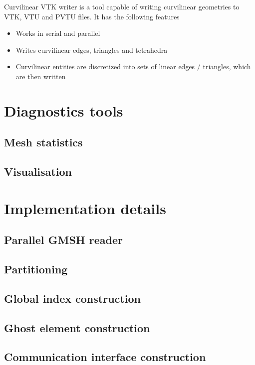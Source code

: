 \documentclass[12pt]{article}
\begin{document}
Curvilinear VTK writer is a tool capable of writing curvilinear geometries to VTK, VTU and PVTU files. It has the following features
\begin{itemize}
	\item Works in serial and parallel
	\item Writes curvilinear edges, triangles and tetrahedra
	\item Curvilinear entities are discretized into sets of linear edges / triangles, which are then written
	
\end{itemize}




\section{Diagnostics tools}
\subsection{Mesh statistics}
\subsection{Visualisation}

\section{Implementation details}
\subsection{Parallel GMSH reader}
\subsection{Partitioning}
\subsection{Global index construction}
\subsection{Ghost element construction}
\subsection{Communication interface construction}

%
%


\printindex
\end{document}
